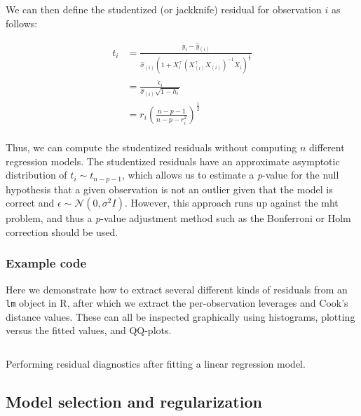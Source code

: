 \documentclass{report}
\begin{document}
We can then define the studentized (or jackknife) residual for observation $i$ as follows:

\begin{equation}\label{eq:ols-jackknife-resid}
    \begin{aligned}
        t_i 
          &= \frac{y_i -\hat{y}_{(i)}}{\hat{\sigma}_{(i)}\left(1 + X_i^\intercal \left(X_{(i)}^\intercal X_{(i)}\right)^{-1}X_i\right)^{\frac{1}{2}}} \\
          &= \frac{\hat{\epsilon}_i}{\hat{\sigma}_{(i)}\sqrt{1 - h_i}} \\
          &= r_i\left(\frac{n-p-1}{n-p-r_i^2}\right)^{\frac{1}{2}} \\
    \end{aligned}
\end{equation}

Thus, we can compute the studentized residuals without computing $n$ different regression models. The studentized residuals have an approximate asymptotic distribution of $t_i \sim t_{n-p-1}$, which allows us to estimate a \textit{p}-value for the null hypothesis that a given observation is not an outlier given that the model is correct and $\epsilon \sim \mathcal{N}(0, \sigma^2I)$. However, this approach runs up against the \gls{mht} problem, and thus a \textit{p}-value adjustment method such as the Bonferroni or Holm correction should be used. 

\subsubsection{Example code}

Here we demonstrate how to extract several different kinds of residuals from an \texttt{lm} object in R, after which we extract the per-observation leverages and Cook's distance values. These can all be inspected graphically using histograms, plotting versus the fitted values, and QQ-plots. 

\begin{listing}[H]
\inputminted{r}{Example-Code/residual_diagnostics_gaussian.R}
\caption{Performing residual diagnostics after fitting a linear regression model.}
\label{listing:residuals-example}
\end{listing}

\subsection{Model selection and regularization}
\end{document}
